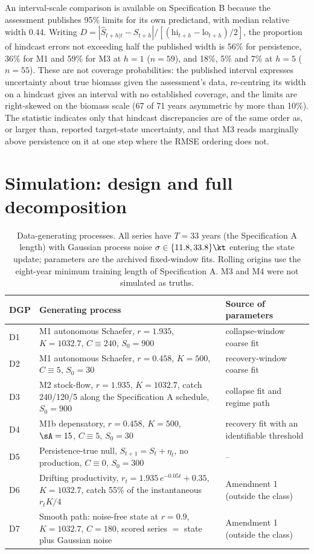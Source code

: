 An interval-scale comparison is available on Specification B because the assessment publishes 95\% limits for its own predictand, with median relative width 0.44. Writing $D = |\hat S_{t+h|t} - S_{t+h}| / [(\mathrm{hi}_{t+h}-\mathrm{lo}_{t+h})/2]$, the proportion of hindcast errors not exceeding half the published width is 56\% for persistence, 36\% for M1 and 59\% for M3 at $h=1$ ($n=59$), and 18\%, 5\% and 7\% at $h=5$ ($n=55$). These are not coverage probabilities: the published interval expresses uncertainty about true biomass given the assessment's data, re-centring its width on a hindcast gives an interval with no established coverage, and the limits are right-skewed on the biomass scale (67 of 71 years asymmetric by more than 10\%). The statistic indicates only that hindcast discrepancies are of the same order as, or larger than, reported target-state uncertainty, and that M3 reads marginally above persistence on it at one step where the RMSE ordering does not.

\FloatBarrier
\section{Simulation: design and full decomposition}\label{si:sim}

\begin{table}[!htb]
\centering\small
\caption{Data-generating processes. All series have $T=33$ years (the Specification A length) with Gaussian process noise $\sigma\in\{11.8, 33.8\}\kt$ entering the state update; parameters are the archived fixed-window fits. Rolling origins use the eight-year minimum training length of Specification A. M3 and M4 were not simulated as truths.}
\label{tab:si_dgp}
\begin{tabularx}{\textwidth}{@{}lLL@{}}
\toprule
DGP & Generating process & Source of parameters \\
\midrule
D1 & M1 autonomous Schaefer, $r=1.935$, $K=1032.7$, $C\equiv 240$, $S_0 = 900$ & collapse-window coarse fit \\
D2 & M1 autonomous Schaefer, $r=0.458$, $K=500$, $C\equiv 5$, $S_0 = 30$ & recovery-window coarse fit \\
D3 & M2 stock-flow, $r=1.935$, $K=1032.7$, catch 240/120/5 along the Specification A schedule, $S_0=900$ & collapse fit and regime path \\
D4 & M1b depensatory, $r=0.458$, $K=500$, $\sA=15$, $C\equiv 5$, $S_0=30$ & recovery fit with an identifiable threshold \\
D5 & Persistence-true null, $S_{t+1} = S_t + \eta_t$, no production, $C\equiv 0$, $S_0=300$ & -- \\
D6 & Drifting productivity, $r_t = 1.935\,e^{-0.05t} + 0.35$, $K=1032.7$, catch 55\% of the instantaneous $r_tK/4$ & Amendment 1 (outside the class) \\
D7 & Smooth path: noise-free state at $r=0.9$, $K=1032.7$, $C=180$, scored series $=$ state plus Gaussian noise & Amendment 1 (outside the class) \\
\bottomrule
\end{tabularx}
\end{table}


